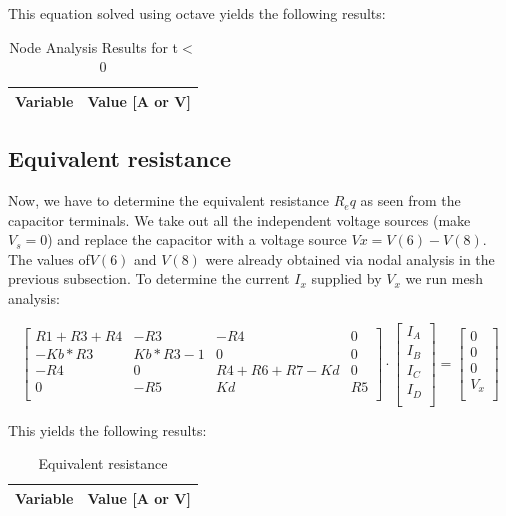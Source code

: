 This equation solved using octave yields the following results:

\begin{table}[H]
    \centering
    \begin{tabular}{|l|r|}
      \hline    
      {\bf Variable} & {\bf Value [A or V]} \\ \hline
    \end{tabular}
    \caption{Node Analysis Results for t$<$0}
    \label{tab:nodeanalysis}
  \end{table}
  
  
\subsection{Equivalent resistance}
Now,  we have to determine the equivalent resistance $R_eq$ as seen from the capacitor terminals. We take out all the independent voltage sources (make $V_s=0$) and replace the capacitor with a voltage source $Vx= V(6)-V(8)$. The values of$ V(6)$ and $V(8)$ were already obtained via nodal analysis in the previous subsection. To determine the current $I_x$ supplied by $V_x$ we run mesh analysis:


\begin{equation}\label{eq:matrixeq2}
\begin{bmatrix}
 R1+R3+R4 & -R3 & -R4 & 0\\
    -Kb*R3 &  Kb*R3-1 & 0 & 0\\ 
    -R4 & 0 & R4+R6+R7-Kd & 0\\
    0 & -R5 & Kd & R5 \\
\end{bmatrix}
\cdot
\begin{bmatrix}
I_A\\
I_B \\
I_C \\
I_D \\

    \end{bmatrix}
=
    \begin{bmatrix}
0 \\
0 \\
0 \\
V_x \\

    \end{bmatrix}
  \end{equation}

This yields the following results:

\begin{table}[H]
    \centering
    \begin{tabular}{|l|r|}
      \hline    
      {\bf Variable} & {\bf Value [A or V]} \\ \hline
    \end{tabular}
    \caption{Equivalent resistance}
    \label{tab:equivalentresistance}
  \end{table}
  
